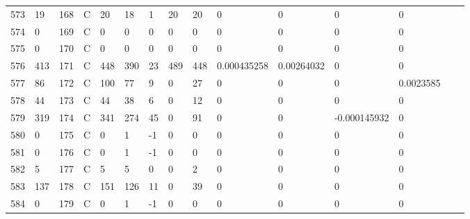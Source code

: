 \begin{longtable}{lllllllllllllll}
	573 & 19                & 168 & C   & 20                & 18                & 1                 & 20   & 20         & 0              & 0              & 0             & 0            \\
	574 & 0                 & 169 & C   & 0                 & 0                 & 0                 & 0    & 0          & 0              & 0              & 0             & 0            \\
	575 & 0                 & 170 & C   & 0                 & 0                 & 0                 & 0    & 0          & 0              & 0              & 0             & 0            \\
	576 & 413               & 171 & C   & 448               & 390               & 23                & 489  & 448        & 0.000435258    & 0.00264032     & 0             & 0            \\
	577 & 86                & 172 & C   & 100               & 77                & 9                 & 0    & 27         & 0              & 0              & 0             & 0.0023585    \\
	578 & 44                & 173 & C   & 44                & 38                & 6                 & 0    & 12         & 0              & 0              & 0             & 0            \\
	579 & 319               & 174 & C   & 341               & 274               & 45                & 0    & 91         & 0              & 0              & -0.000145932  & 0            \\
	580 & 0                 & 175 & C   & 0                 & 1                 & -1                & 0    & 0          & 0              & 0              & 0             & 0            \\
	581 & 0                 & 176 & C   & 0                 & 1                 & -1                & 0    & 0          & 0              & 0              & 0             & 0            \\
	582 & 5                 & 177 & C   & 5                 & 5                 & 0                 & 0    & 2          & 0              & 0              & 0             & 0            \\
	583 & 137               & 178 & C   & 151               & 126               & 11                & 0    & 39         & 0              & 0              & 0             & 0            \\
	584 & 0                 & 179 & C   & 0                 & 1                 & -1                & 0    & 0          & 0              & 0              & 0             & 0            \\

\end{longtable}
